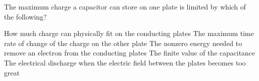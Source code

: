 \begin{questions}\setcounter{question}{13}\question
The maximum charge a capacitor can store on one plate is limited by which of the following?

\begin{choices}
\choice How much charge can physically fit on the conducting plates
\choice The maximum time rate of change of the charge on the other plate
\choice The nonzero energy needed to remove an electron from the conducting plates
\choice The finite value of the capacitance
\choice The electrical discharge when the electric field between the plates becomes too great
\end{choices}\end{questions}

